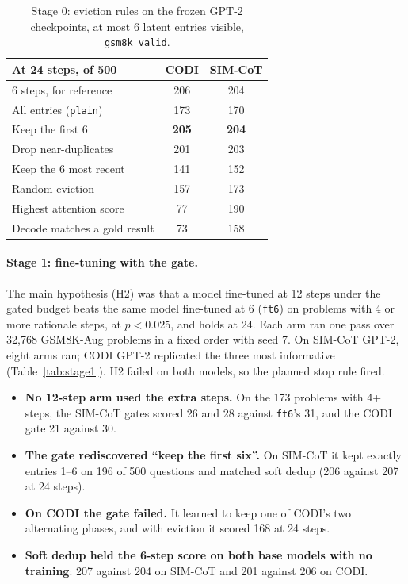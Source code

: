 \documentclass[11pt]{article}
\newcommand{\pol}[1]{\texttt{#1}}
\begin{document}
\begin{table}[t]
\centering
\small
\setlength{\tabcolsep}{4pt}
\begin{tabular}{lcc}
\toprule
At 24 steps, of 500 & CODI & SIM-CoT \\
\midrule
6 steps, for reference & 206 & 204 \\
\midrule
All entries (\pol{plain}) & 173 & 170 \\
Keep the first 6 & \textbf{205} & \textbf{204} \\
Drop near-duplicates & 201 & 203 \\
Keep the 6 most recent & 141 & 152 \\
Random eviction & 157 & 173 \\
Highest attention score & 77 & 190 \\
Decode matches a gold result & 73 & 158 \\
\bottomrule
\end{tabular}
\caption{Stage 0: eviction rules on the frozen GPT-2 checkpoints, at most 6 latent entries visible, \texttt{gsm8k\_valid}.}
\label{tab:stage0}
\end{table}

\paragraph{Stage 1: fine-tuning with the gate.} The main hypothesis (H2) was that a model fine-tuned at 12 steps under the
gated budget beats the same model fine-tuned at 6 (\pol{ft6}) on problems with 4 or more rationale steps, at $p < 0.025$,
and holds at 24. Each arm ran one pass over 32,768 GSM8K-Aug problems in a fixed order with seed 7. On SIM-CoT GPT-2, eight
arms ran; CODI GPT-2 replicated the three most informative (Table~\ref{tab:stage1}). H2 failed on both models, so the
planned stop rule fired.
\begin{itemize}
  \item \textbf{No 12-step arm used the extra steps.} On the 173 problems with 4+ steps, the SIM-CoT gates scored 26 and 28
    against \pol{ft6}'s 31, and the CODI gate 21 against 30.
  \item \textbf{The gate rediscovered ``keep the first six''.} On SIM-CoT it kept exactly entries 1--6 on 196 of 500
    questions and matched soft dedup (206 against 207 at 24 steps).
  \item \textbf{On CODI the gate failed.} It learned to keep one of CODI's two alternating phases, and with eviction it
    scored 168 at 24 steps.
  \item \textbf{Soft dedup held the 6-step score on both base models with no training}: 207 against 204 on SIM-CoT and 201
    against 206 on CODI.
\end{itemize}
\end{document}
